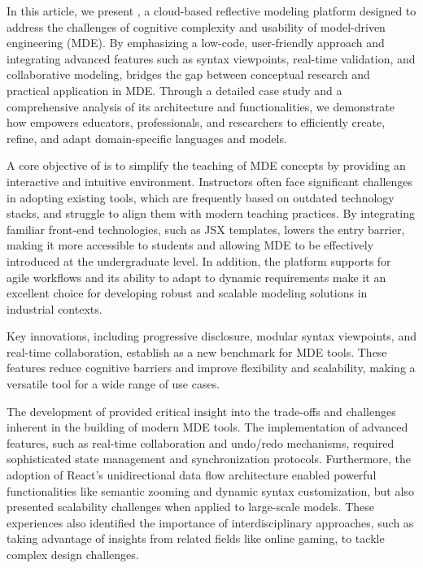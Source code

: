 In this article, we present \jjodel{}, a cloud-based reflective modeling platform designed to address the challenges of cognitive complexity and usability of model-driven engineering (MDE). By emphasizing a low-code, user-friendly approach and integrating advanced features such as syntax viewpoints, real-time validation, and collaborative modeling, \jjodel{} bridges the gap between conceptual research and practical application in MDE. Through a detailed case study and a comprehensive analysis of its architecture and functionalities, we demonstrate how \jjodel{} empowers educators, professionals, and researchers to efficiently create, refine, and adapt domain-specific languages and models.

A core objective of \jjodel{} is to simplify the teaching of MDE concepts by providing an interactive and intuitive environment. Instructors often face significant challenges in adopting existing tools, which are frequently based on outdated technology stacks, and struggle to align them with modern teaching practices. By integrating familiar front-end technologies, such as JSX templates, \jjodel{} lowers the entry barrier, making it more accessible to students and allowing MDE to be effectively introduced at the undergraduate level. In addition, the platform supports for agile workflows and its ability to adapt to dynamic requirements make it an excellent choice for developing robust and scalable modeling solutions in industrial contexts.

Key innovations, including progressive disclosure, modular syntax viewpoints, and real-time collaboration, establish \jjodel{} as a new benchmark for MDE tools. These features reduce cognitive barriers and improve flexibility and scalability, making \jjodel{} a versatile tool for a wide range of use cases.

The development of \jjodel{} provided critical insight into the trade-offs and challenges inherent in the building of modern MDE tools. The implementation of advanced features, such as real-time collaboration and undo/redo mechanisms, required sophisticated state management and synchronization protocols. Furthermore, the adoption of React’s unidirectional data flow architecture enabled powerful functionalities like semantic zooming and dynamic syntax customization, but also presented scalability challenges when applied to large-scale models. These experiences also identified the importance of interdisciplinary approaches, such as taking advantage of insights from related fields like online gaming, to tackle complex design challenges.

